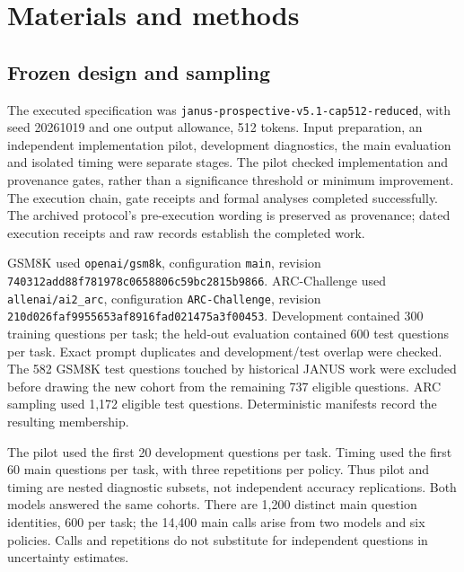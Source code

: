\documentclass[12pt,a4paper]{article}
\begin{document}
\section{Materials and methods}
\subsection{Frozen design and sampling}
The executed specification was \texttt{janus-prospective-v5.1-cap512-reduced}, with seed 20261019 and one output allowance, 512 tokens. Input preparation, an independent implementation pilot, development diagnostics, the main evaluation and isolated timing were separate stages. The pilot checked implementation and provenance gates, rather than a significance threshold or minimum improvement. The execution chain, gate receipts and formal analyses completed successfully. The archived protocol's pre-execution wording is preserved as provenance; dated execution receipts and raw records establish the completed work.

GSM8K used \texttt{openai/gsm8k}, configuration \texttt{main}, revision \texttt{740312ad\allowbreak{}d88f7819\allowbreak{}78c06588\allowbreak{}06c59bc2\allowbreak{}815b9866}. ARC-Challenge used \texttt{allenai/ai2\_arc}, configuration \texttt{ARC-Challenge}, revision \texttt{210d026f\allowbreak{}af995565\allowbreak{}3af8916f\allowbreak{}ad021475\allowbreak{}a3f00453}. Development contained 300 training questions per task; the held-out evaluation contained 600 test questions per task. Exact prompt duplicates and development/test overlap were checked. The 582 GSM8K test questions touched by historical JANUS work were excluded before drawing the new cohort from the remaining 737 eligible questions. ARC sampling used 1,172 eligible test questions. Deterministic manifests record the resulting membership.

The pilot used the first 20 development questions per task. Timing used the first 60 main questions per task, with three repetitions per policy. Thus pilot and timing are nested diagnostic subsets, not independent accuracy replications. Both models answered the same cohorts. There are 1,200 distinct main question identities, 600 per task; the 14,400 main calls arise from two models and six policies. Calls and repetitions do not substitute for independent questions in uncertainty estimates.
\end{document}
